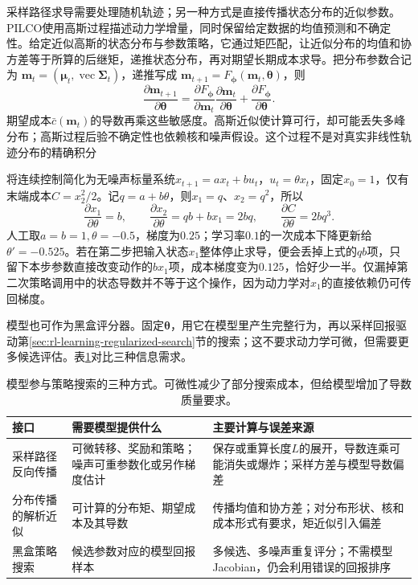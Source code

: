 采样路径求导需要处理随机轨迹；另一种方式是直接传播状态分布的近似参数。PILCO使用高斯过程描述动力学增量，同时保留给定数据的均值预测和不确定性。给定近似高斯的状态分布与参数策略，它通过矩匹配，让近似分布的均值和协方差等于所算的后继矩，递推状态分布，再对期望长期成本求导。把分布参数合记为
$\bm m_t=(\bm\mu_t,\operatorname{vec}\bm\Sigma_t)$，递推写成
$\bm m_{t+1}=F_{\bm\phi}(\bm m_t,\bm\theta)$，则
\[
 \frac{\partial\bm m_{t+1}}{\partial\bm\theta}
  =\frac{\partial F_{\bm\phi}}{\partial\bm m_t}
       \frac{\partial\bm m_t}{\partial\bm\theta}
       +\frac{\partial F_{\bm\phi}}{\partial\bm\theta}.
\]
期望成本$\bar c(\bm m_t)$的导数再乘这些敏感度。高斯近似使计算可行，却可能丢失多峰分布；高斯过程后验不确定性也依赖核和噪声假设。这个过程不是对真实非线性轨迹分布的精确积分

\begin{example}[两步模型梯度]
  \label{ex:rl-learning-two-step-gradient}
  将连续控制简化为无噪声标量系统$x_{t+1}=ax_t+bu_t$，$u_t=\theta x_t$，固定$x_0=1$，仅有末端成本$C=x_2^2/2$。记$q=a+b\theta$，则$x_1=q$、$x_2=q^2$，所以
  \[
    \frac{\partial x_1}{\partial\theta}=b,\qquad
    \frac{\partial x_2}{\partial\theta}
       =q b+b x_1=2bq,\qquad
    \frac{\partial C}{\partial\theta}=2bq^3.
  \]
  人工取$a=b=1,\theta=-0.5$，梯度为$0.25$；学习率$0.1$的一次成本下降更新给$\theta'=-0.525$。若在第二步把输入状态$x_1$整体停止求导，便会丢掉上式的$q b$项，只留下本步参数直接改变动作的$b x_1$项，成本梯度变为$0.125$，恰好少一半。仅漏掉第二次策略调用中的状态导数并不等于这个操作，因为动力学对$x_1$的直接依赖仍可传回梯度。
\end{example}

模型也可作为黑盒评分器。固定$\bm\theta$，用它在模型里产生完整行为，再以采样回报驱动第\ref{sec:rl-learning-regularized-search}节的搜索；这不要求动力学可微，但需要更多候选评估。表\ref{tab:rl-learning-model-gradient-interfaces}对比三种信息需求。

\begin{table}[t]
  \centering
  \small
  \begin{tabularx}{\linewidth}{>{\raggedright\arraybackslash}p{25mm} >{\raggedright\arraybackslash}X >{\raggedright\arraybackslash}X}
    \toprule
    接口 & 需要模型提供什么 & 主要计算与误差来源 \\
    \midrule
    采样路径反向传播 & 可微转移、奖励和策略；噪声可重参数化或另作梯度估计 & 保存或重算长度$L$的展开，导数连乘可能消失或爆炸；采样方差与模型导数偏差 \\
    分布传播的解析近似 & 可计算的分布矩、期望成本及其导数 & 传播均值和协方差；对分布形状、核和成本形式有要求，矩近似引入偏差 \\
    黑盒策略搜索 & 候选参数对应的模型回报样本 & 多候选、多噪声重复评分；不需模型Jacobian，仍会利用错误的回报排序 \\
    \bottomrule
  \end{tabularx}
  \caption{模型参与策略搜索的三种方式。可微性减少了部分搜索成本，但给模型增加了导数质量要求。}
  \label{tab:rl-learning-model-gradient-interfaces}
\end{table}

